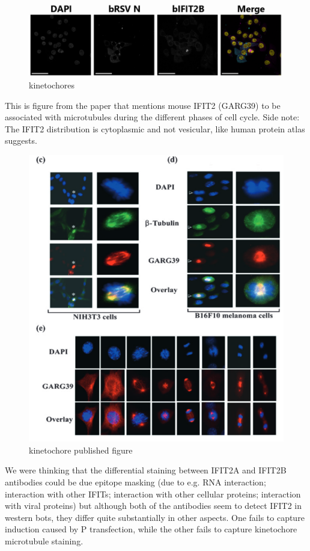 \begin{figure}
    \centering
    \includegraphics[width=1\linewidth]{09. Chapter 4/Figs/05. IFIT2AB Discussion/03. kinetochores.png}
    \caption[kinetochores]{kinetochores}
    \label{fig:kinetochores}
\end{figure}

This is figure from the paper that mentions mouse IFIT2 (GARG39) to be associated with microtubules during the different phases of cell cycle.
Side note: The IFIT2 distribution is cytoplasmic and not vesicular, like human protein atlas suggests.

\begin{figure}
    \centering
    \includegraphics[width=1\linewidth]{09. Chapter 4/Figs/05. IFIT2AB Discussion/04. kinetochore published figure.png}
    \caption[kinetochore published figure]{kinetochore published figure}
    \label{fig:kinetochore published figure}
\end{figure}

We were thinking that the differential staining between IFIT2A and IFIT2B antibodies could be due epitope masking (due to e.g. RNA interaction; interaction with other IFITs; interaction with other cellular proteins; interaction with viral proteins) but although both of the antibodies seem to detect IFIT2 in western bots, they differ quite substantially in other aspects. One fails to capture induction caused by P transfection, while the other fails to capture kinetochore microtubule staining.